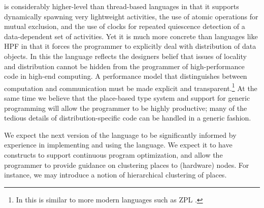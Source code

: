 {}\Xten{} is considerably higher-level than thread-based languages in
that it supports dynamically spawning very lightweight activities, the
use of atomic operations for mutual exclusion, and the use of clocks
for repeated quiescence detection of a data-dependent set of
activities. Yet it is much more concrete than languages like HPF in
that it forces the programmer to explicitly deal with distribution of
data objects. In this the language reflects the designers belief that
issues of locality and distribution cannot be hidden from the
programmer of high-performance code in high-end computing.  A
performance model that distinguishes between computation and
communication must be made explicit and transparent.\footnote{In this
\Xten{} is similar to more modern languages such as ZPL \cite{zpl}.} At
the same time we believe that the place-based type system and support
for generic programming will allow the \Xten{} programmer to be highly
productive; many of the tedious details of distribution-specific code
can be handled in a generic fashion.

We expect the next version of the language to be significantly
informed by experience in implementing and using the language. We
expect it to have constructs to support continuous program
optimization, and allow the programmer to provide guidance on
clustering places to (hardware) nodes. For instance, we may introduce
a notion of hierarchical clustering of places.




